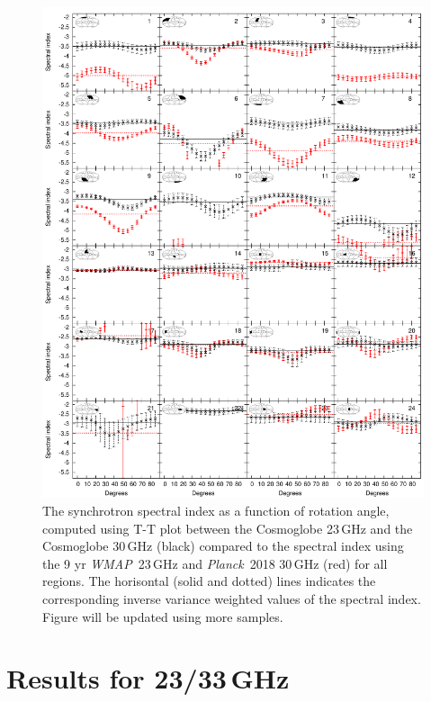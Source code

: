 \documentclass[twocolumn]{../../common/aa}
\def\WMAP{\emph{WMAP}}
\def\Planck{\emph{Planck}}
\newcommand{\red}[0]{\color{red}}
\begin{document}
\begin{figure}
        \centering
        \includegraphics[width=\linewidth]{figures/cos30_ut_big_multialphaplot_converted.pdf}
        \caption{The synchrotron spectral index as a function of rotation angle, computed using T-T plot between the Cosmoglobe 23\,GHz and the Cosmoglobe 30\,GHz (black) compared to the spectral index using the 9 yr \WMAP\ 23\,GHz and \Planck\ 2018 30\,GHz (red) for all regions. The horisontal (solid and dotted) lines indicates the corresponding inverse variance weighted values of the spectral index. {\red Figure will be updated using more samples.}}
        \label{fig:cos30_beta_bigalpha}
\end{figure}


\section{Results for 23/33\,GHz}
\label{sec:results23-33}
\end{document}
